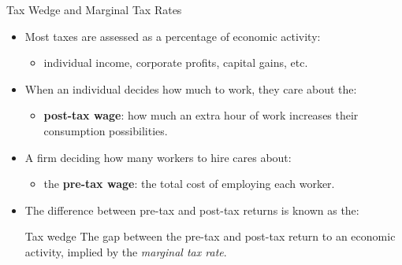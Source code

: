 \documentclass[aspectratio=169]{beamer}
\begin{document}
\begin{frame}{Tax Wedge and Marginal Tax Rates}
\transfade
\begin{itemize}[<+->]
  \item Most taxes are assessed as a percentage of economic activity:
  \begin{itemize}[<+->]
    \item individual income, corporate profits, capital gains, etc.
  \end{itemize}
  \item When an individual decides how much to work, they care about the:
  \begin{itemize}[<+->]
    \item \textbf{post-tax wage}: how much an extra hour of work increases their consumption possibilities.
  \end{itemize}
  \item A firm deciding how many workers to hire cares about:
  \begin{itemize}[<+->]
    \item the \textbf{pre-tax wage}: the total cost of employing each worker.
  \end{itemize}
  \item The difference between pre-tax and post-tax returns is known as the:
  \begin{block}{Tax wedge}
    The gap between the pre-tax and post-tax return to an economic activity, implied by the \emph{marginal tax rate}.
  \end{block}
\end{itemize}
\end{frame}
\end{document}
